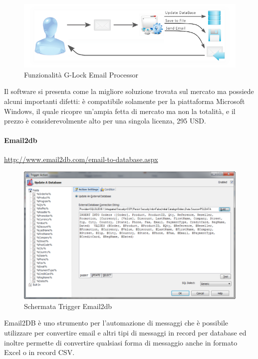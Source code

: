 \begin{figure}[H]
\centering 
\includegraphics[scale=2]{img/emailprocessor.png} 
\caption{Funzionalità G-Lock Email Processor}
\end{figure}

Il software si presenta come la migliore soluzione trovata sul mercato ma possiede alcuni importanti difetti: è compatibile solamente per la piattaforma Microsoft Windows, il quale ricopre un'ampia fetta di mercato ma non la totalità, e il prezzo è considerevolmente alto per una singola licenza, 295 USD.

\paragraph{Email2db}
\url{http://www.email2db.com/email-to-database.aspx}

\begin{figure}[H]
\centering 
\includegraphics[scale=0.6]{img/email2db.png} 
\caption{Schermata Trigger Email2db}
\end{figure}

Email2DB è uno strumento per l'automazione di messaggi che è possibile utilizzare per convertire email e altri tipi di messaggi in record per database ed inoltre permette di convertire qualsiasi forma di messaggio anche in formato Excel o in record CSV.

